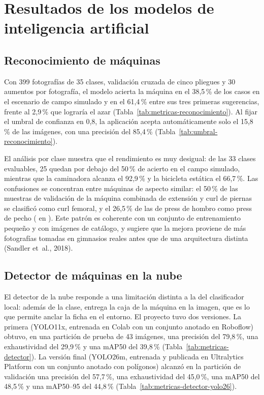 \section{Resultados de los modelos de inteligencia artificial}
\label{sec:res-ia}

\subsection{Reconocimiento de máquinas}

Con 399 fotografías de 35 clases, validación cruzada de cinco pliegues y 30
aumentos por fotografía, el modelo acierta la máquina en el 38,5\,\% de los
casos en el escenario de campo simulado y en el 61,4\,\% entre sus tres
primeras sugerencias, frente al 2,9\,\% que lograría el azar
(Tabla~\ref{tab:metricas-reconocimiento}). Al fijar el umbral de confianza en
0,8, la aplicación acepta automáticamente solo el 15,8\,\% de las imágenes, con
una precisión del 85,4\,\% (Tabla~\ref{tab:umbral-reconocimiento}).

El análisis por clase muestra que el rendimiento es muy desigual: de las 33
clases evaluables, 25 quedan por debajo del 50\,\% de acierto en el campo
simulado, mientras que la caminadora alcanza el 92,9\,\% y la bicicleta
estática el 66,7\,\%. Las confusiones se concentran entre máquinas de aspecto
similar: el 50\,\% de las muestras de validación de la máquina combinada de
extensión y curl de piernas se clasificó como curl femoral, y el 26,5\,\% de
las de press de hombro como press de pecho
( en
). Este patrón es coherente con un conjunto
de entrenamiento pequeño y con imágenes de catálogo, y sugiere que la mejora
proviene de más fotografías tomadas en gimnasios reales antes que de una
arquitectura distinta (Sandler et~al., 2018).

\subsection{Detector de máquinas en la nube}

El detector de la nube responde a una limitación distinta a la del clasificador
local: además de la clase, entrega la caja de la máquina en la imagen, que es lo
que permite anclar la ficha en el entorno. El proyecto tuvo dos versiones. La
primera (YOLO11x, entrenada en Colab con un conjunto anotado en Roboflow)
obtuvo, en una partición de prueba de 43 imágenes, una precisión del 79,8\,\%,
una exhaustividad del 29,9\,\% y una mAP50 del 39,8\,\%
(Tabla~\ref{tab:metricas-detector}). La versión final (YOLO26m, entrenada y
publicada en Ultralytics Platform con un conjunto anotado con polígonos) alcanzó
en la partición de validación una precisión del 57,7\,\%, una exhaustividad del
45,0\,\%, una mAP50 del 48,5\,\% y una mAP50--95 del 44,8\,\%
(Tabla~\ref{tab:metricas-detector-yolo26}).

